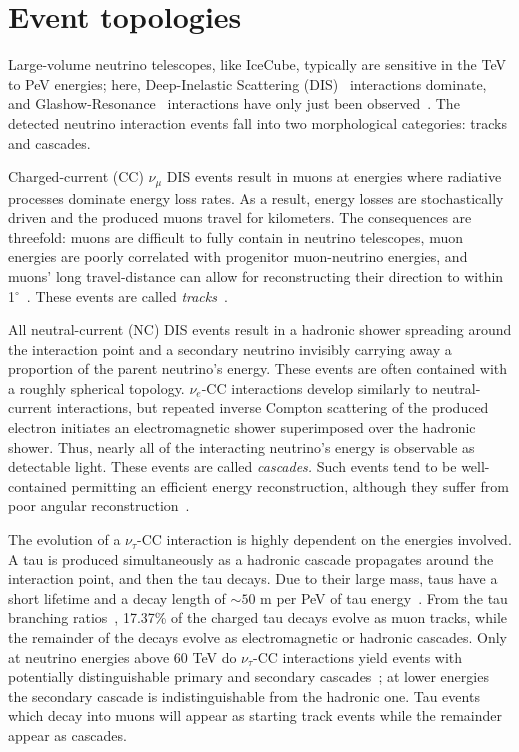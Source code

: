 \documentclass[main.tex]{subfiles}
\begin{document}
\section{Event topologies}\label{sec:event_morphology}

Large-volume neutrino telescopes, like IceCube, typically are sensitive in the TeV to PeV energies; here, Deep-Inelastic Scattering (DIS)~\cite{gandhineutrinos} interactions dominate, and Glashow-Resonance~\cite{PhysRev.118.316} interactions have only just been observed~\cite{IceCube:2021rpz}.
The detected neutrino interaction events fall into two morphological categories: tracks and cascades.

Charged-current (CC) $\nu_{\mu}$ DIS events result in muons at energies where radiative processes dominate energy loss rates.
As a result, energy losses are stochastically driven and the produced muons travel for kilometers. 
The consequences are threefold: muons are difficult to fully contain in neutrino telescopes, muon energies are poorly correlated with progenitor muon-neutrino energies, and muons' long travel-distance can allow for reconstructing their direction to within 1$^{\circ}$~\cite{trackaccuracy2017}. These events are called \textit{tracks}~\cite{icecube_energy_reco}.

All neutral-current (NC) DIS events result in a hadronic shower spreading around the interaction point and a secondary neutrino invisibly carrying away a proportion of the parent neutrino's energy. 
These events are often contained with a roughly spherical topology. 
$\nu_{e}$-CC interactions develop similarly to neutral-current interactions, but repeated inverse Compton scattering of the produced electron initiates an electromagnetic shower superimposed over the hadronic shower. 
Thus, nearly all of the interacting neutrino's energy is observable as detectable light. 
These events are called \textit{cascades.} Such events tend to be well-contained permitting an efficient energy reconstruction, although they suffer from poor angular reconstruction~\cite{icecube_energy_reco}. 

The evolution of a $\nu_{\tau}$-CC interaction is highly dependent on the energies involved. A tau is produced simultaneously as a hadronic cascade propagates around the interaction point, and then the tau decays. 
Due to their large mass, taus have a short lifetime and a decay length of $\sim 50$ m per PeV of tau energy~\cite{abbasi2020measurement}. 
From the tau branching ratios~\cite{PhysRevD.98.030001}, 17.37\% of the charged tau decays evolve as muon tracks, while the remainder of the decays evolve as electromagnetic or hadronic cascades. Only at neutrino energies above 60 TeV do $\nu_{\tau}$-CC interactions yield events with potentially distinguishable primary and secondary cascades~\cite{abbasi2020measurement}; at lower energies the secondary cascade is indistinguishable from the hadronic one. Tau events which decay into muons will appear as starting track events while the remainder appear as cascades. 
\end{document}
